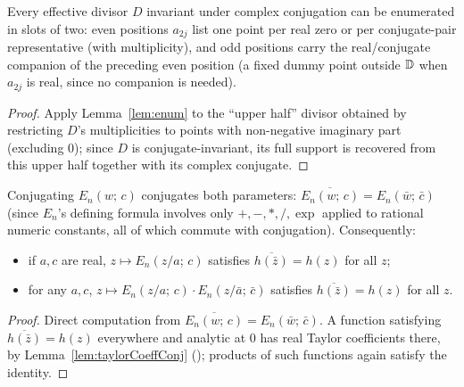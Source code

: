 \begin{lemma}
  \label{lem:pairedEnum}
  \leanok
  Every effective divisor $D$ invariant under complex conjugation can be
  enumerated in slots of two: even positions $a_{2j}$ list one point per
  real zero or per conjugate-pair representative (with multiplicity),
  and odd positions carry the real/conjugate companion of the preceding
  even position (a fixed dummy point outside $\mathbb{D}$ when $a_{2j}$ is real,
  since no companion is needed).
\end{lemma}
\begin{proof}
  \leanok
  Apply Lemma~\ref{lem:enum} to the ``upper half'' divisor obtained by
  restricting $D$'s multiplicities to points with non-negative imaginary
  part (excluding $0$); since $D$ is conjugate-invariant, its full
  support is recovered from this upper half together with its complex
  conjugate.
\end{proof}

\begin{lemma}
  \label{lem:slotConjSymmetric}
  \leanok
  Conjugating $E_n(w;\,c)$ conjugates both parameters:
  $\overline{E_n(w;\,c)} = E_n(\bar w;\,\bar c)$ (since $E_n$'s defining
  formula involves only $+,-,*,/,\exp$ applied to rational numeric
  constants, all of which commute with conjugation). Consequently:
  \begin{itemize}
    \item if $a, c$ are real, $z \mapsto E_n(z/a;\,c)$ satisfies
      $\overline{h(\bar z)} = h(z)$ for all $z$;
    \item for any $a, c$, $z \mapsto E_n(z/a;\,c)\cdot E_n(z/\bar
      a;\,\bar c)$ satisfies $\overline{h(\bar z)} = h(z)$ for all $z$.
  \end{itemize}
\end{lemma}
\begin{proof}
  \leanok
  Direct computation from $\overline{E_n(w;\,c)} = E_n(\bar w;\,\bar c)$.
  A function satisfying $\overline{h(\bar z)} = h(z)$ everywhere and
  analytic at $0$ has real Taylor coefficients there, by
  Lemma~\ref{lem:taylorCoeffConj}
  (); products of
  such functions again satisfy the identity.
\end{proof}

